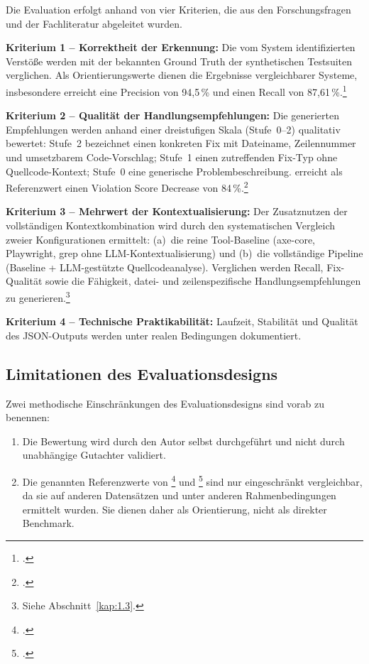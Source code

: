 Die Evaluation erfolgt anhand von vier Kriterien, die aus den Forschungsfragen und der Fachliteratur abgeleitet wurden.

\textbf{Kriterium 1 -- Korrektheit der Erkennung:} Die vom System identifizierten Verstöße werden mit der bekannten Ground Truth der synthetischen Testsuiten verglichen. Als Orientierungswerte dienen die Ergebnisse vergleichbarer Systeme, insbesondere  erreicht eine Precision von 94{,}5\,\% und einen Recall von 87{,}61\,\%.\footcite[Vgl.][FSE101:20]{he_enhancing_2025}

\textbf{Kriterium 2 -- Qualität der Handlungsempfehlungen:} Die generierten Empfehlungen werden anhand einer dreistufigen Skala (Stufe~0--2) qualitativ bewertet: Stufe~2 bezeichnet einen konkreten Fix mit Dateiname, Zeilennummer und umsetzbarem Code-Vorschlag; Stufe~1 einen zutreffenden Fix-Typ ohne Quellcode-Kontext; Stufe~0 eine generische Problembeschreibung.  erreicht als Referenzwert einen Violation Score Decrease von 84\,\%.\footcite[Vgl.][]{fathallah_accessguru_2025}

\textbf{Kriterium 3 -- Mehrwert der Kontextualisierung:} Der Zusatznutzen der vollständigen Kontextkombination wird durch den systematischen Vergleich zweier Konfigurationen ermittelt: (a)~die reine Tool-Baseline (axe-core, Playwright, grep ohne \ac{LLM}-Kontextualisierung) und (b)~die vollständige Pipeline (Baseline + \ac{LLM}-gestützte Quellcodeanalyse). Verglichen werden Recall, Fix-Qualität sowie die Fähigkeit, datei- und zeilenspezifische Handlungsempfehlungen zu generieren.\footnote{Siehe Abschnitt~\ref{kap:1.3}.}

\textbf{Kriterium 4 -- Technische Praktikabilität:} Laufzeit, Stabilität und Qualität des \acs{JSON}-Outputs werden unter realen Bedingungen dokumentiert.

\subsection{Limitationen des Evaluationsdesigns}

Zwei methodische Einschränkungen des Evaluationsdesigns sind vorab zu benennen:
\begin{enumerate}
    \item Die Bewertung wird durch den Autor selbst durchgeführt und nicht durch unabhängige Gutachter validiert.
    \item Die genannten Referenzwerte von \footcite[Vgl.][]{fathallah_accessguru_2025} und \footcite[Vgl.][]{he_enhancing_2025} sind nur eingeschränkt vergleichbar, da sie auf anderen Datensätzen und unter anderen Rahmenbedingungen ermittelt wurden. Sie dienen daher als Orientierung, nicht als direkter Benchmark.
\end{enumerate}